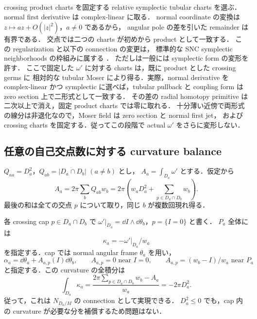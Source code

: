 crossing product charts を固定する relative symplectic tubular charts を選ぶ．
normal first derivative は complex-linear に取る．
normal coordinate の変換は $z\mapsto a z+O(|z|^2)$，$a\neq0$ であるから，
angular pole の差を引いた remainder は有界である．
交点では二つの charts が初めから product として一致する．
この regularization と以下の connection の変更は，
標準的な SNC symplectic neighborhoods の枠組みに属する
\cite[\S2.4, Appendix A]{EM}\cite{TMZ}．
ただし\cite[Theorem 2.13]{TMZ}は一般には symplectic form の変形を許す．
ここで固定した $\omega'$ に対する charts は，既に product とした crossing germs に
相対的な tubular Moser により得る．実際，normal derivative を complex-linear かつ
symplectic に選べば，tubular pullback と coupling form は zero section 上で二形式として一致する．
その差の radial homotopy primitive は二次以上で消え，固定 product charts では零に取れる．
十分薄い近傍で両形式の線分は非退化なので，Moser field は zero section と normal first jet，
および crossing charts を固定する．従ってこの段階で actual $\omega'$ をさらに変形しない．

\subsection{任意の自己交点数に対する curvature balance}

$Q_{aa}=D_a^2$，$Q_{ab}=|D_a\cap D_b|$ $(a\neq b)$ とし，
$A_a=\int_{D_a}\omega'$ とする．仮定から
\begin{equation}\label{snc:area-balance}
 A_a=2\pi\sum_b Q_{ab}w_b
 =2\pi\left(w_aD_a^2+\sum_{p\in D_a\cap D_b}w_b\right).
\end{equation}
最後の和は全ての交点 $p$ について取り，同じ $b$ が複数回現れ得る．

各 crossing cap $p\in D_a\cap D_b$ で
$\omega'|_{D_a}=\dd I\wedge\dd\theta_b$，$p=\{I=0\}$ と書く．
$P_a$ 全体には
\[
 \kappa_a=-\omega'|_{D_a}/w_a
\]
を指定する．cap では normal angular frame $\theta_a$ を用い，
\begin{equation}\label{snc:connection-cap}
 \alpha_a=\dd\theta_a+A_{a,p}(I)\dd\theta_b,\qquad
 A_{a,p}=0\text{ near }I=0,\qquad
 A_{a,p}=(w_b-I)/w_a\text{ near }P_a
\end{equation}
と指定する．この curvature の全積分は
\begin{equation}\label{snc:curvature-integral}
 \int_{D_a}\kappa_a
 =\frac{2\pi\sum_{p\in D_a\cap D_b}w_b-A_a}{w_a}
 =-2\pi D_a^2.
\end{equation}
従って，これは $N_{D_a/M}$ の connection として実現できる．
$D_a^2\leq0$ でも，cap 内の curvature が必要な分を補償するため問題はない．

